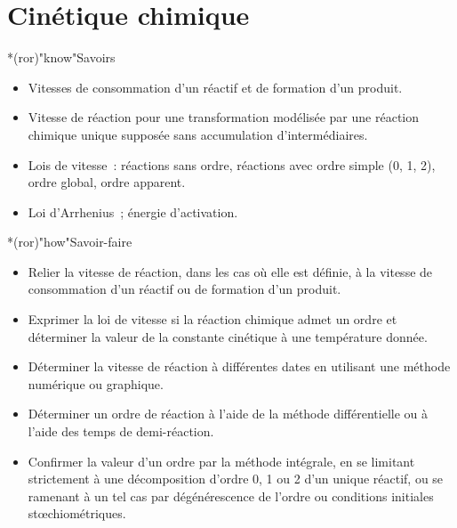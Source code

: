 \documentclass[../../main/main.tex]{subfiles}
\begin{document}
\setcounter{chapter}{2}

\chapter{Cin\'etique chimique}

\vfill

\begin{prgm}
	\begin{tcb}*(ror)"know"{Savoirs}
		\begin{itemize}[label=$\diamond$, leftmargin=10pt]
			\item Vitesses de consommation d'un réactif et de formation d'un produit.
			\item Vitesse de réaction pour une transformation modélisée par une
			      réaction chimique unique supposée sans accumulation
			      d’intermédiaires.
			\item Lois de vitesse~: réactions sans ordre, réactions avec ordre simple
			      (0, 1, 2), ordre global, ordre apparent.
			\item Loi d'Arrhenius~; énergie d'activation.
		\end{itemize}
	\end{tcb}

	\begin{tcb}*(ror)"how"{Savoir-faire}
		\begin{itemize}[label=$\diamond$, leftmargin=10pt]
			\item Relier la vitesse de réaction, dans les cas où elle est définie, à
			      la vitesse de consommation d’un réactif ou de formation d’un
			      produit.
			\item Exprimer la loi de vitesse si la réaction chimique admet un ordre et
			      déterminer la valeur de la constante cinétique à une température
			      donnée.
			\item Déterminer la vitesse de réaction à différentes dates en utilisant
			      une méthode numérique ou graphique.
			\item Déterminer un ordre de réaction à l’aide de la méthode
			      différentielle ou à l’aide des temps de demi-réaction.
			\item Confirmer la valeur d'un ordre par la méthode intégrale, en se
			      limitant strictement à une décomposition d'ordre 0, 1 ou 2 d'un
			      unique réactif, ou se ramenant à un tel cas par dégénérescence de
			      l'ordre ou conditions initiales stœchiométriques.
		\end{itemize}
	\end{tcb}
\end{prgm}
\end{document}
